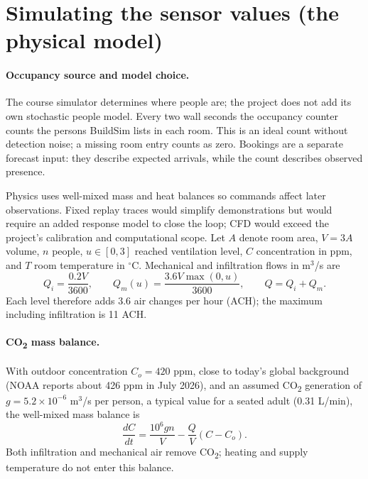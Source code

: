 \documentclass[11pt,a4paper]{article}
\begin{document}
\section{Simulating the sensor values (the physical model)}
\paragraph{Occupancy source and model choice.}
The course simulator determines where people are; the project does not add its own stochastic people model. Every two wall seconds the occupancy counter counts the persons BuildSim lists in each room. This is an ideal count without detection noise; a missing room entry counts as zero. Bookings are a separate forecast input: they describe expected arrivals, while the count describes observed presence.

Physics uses well-mixed mass and heat balances so commands affect later observations. Fixed replay traces would simplify demonstrations but would require an added response model to close the loop; CFD would exceed the project's calibration and computational scope. Let $A$ denote room area, $V=3A$ volume, $n$ people, $u\in[0,3]$ reached ventilation level, $C$ concentration in ppm, and $T$ room temperature in $^\circ$C. Mechanical and infiltration flows in m$^3$/s are
\begin{equation}
Q_i=\frac{0.2V}{3600},\qquad Q_m(u)=\frac{3.6V\max(0,u)}{3600},\qquad Q=Q_i+Q_m.
\end{equation}
Each level therefore adds 3.6 air changes per hour (ACH); the maximum including infiltration is 11 ACH.

\paragraph{CO\textsubscript{2} mass balance.}
With outdoor concentration $C_o=420$ ppm, close to today's global background (NOAA reports about 426 ppm in July 2026), and an assumed CO\textsubscript{2} generation of $g=5.2\times10^{-6}$ m$^3$/s per person, a typical value for a seated adult (0.31 L/min), the well-mixed mass balance is
\begin{equation}
\frac{dC}{dt}=\frac{10^6gn}{V}-\frac{Q}{V}(C-C_o).
\end{equation}
Both infiltration and mechanical air remove CO\textsubscript{2}; heating and supply temperature do not enter this balance.
\end{document}
